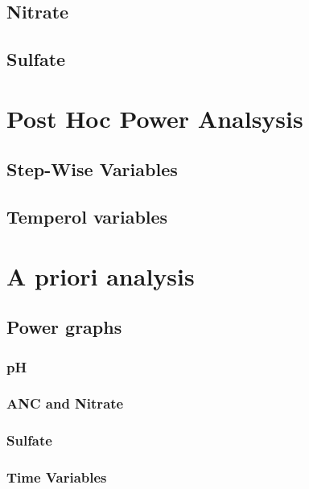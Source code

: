 	\section{Nitrate}
		

	\section{Sulfate}
		


\chapter{Post Hoc Power Analsysis}
	\section{Step-Wise Variables}


	\section{Temperol variables}


\chapter{A priori analysis}\label{ch:APA}
	\section{Power graphs}
		\subsection{pH}
		\subsection{ANC and Nitrate}
			
		\subsection{Sulfate}
			
		\subsection{Time Variables}
			



















